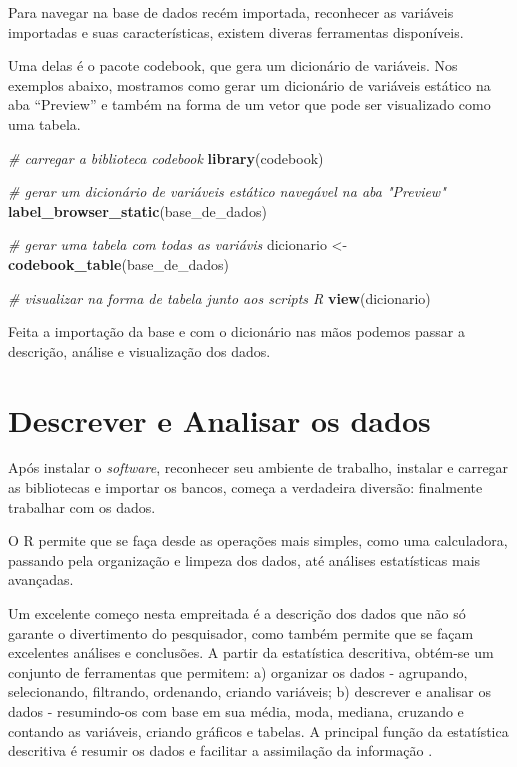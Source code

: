 \documentclass[
  brazil,
]{book}
\newenvironment{Shaded}{\begin{snugshade}}{\end{snugshade}}
\newcommand{\CommentTok}[1]{\textcolor[rgb]{0.56,0.35,0.01}{\textit{#1}}}
\newcommand{\KeywordTok}[1]{\textcolor[rgb]{0.13,0.29,0.53}{\textbf{#1}}}
\newcommand{\NormalTok}[1]{#1}
\newcommand{\StringTok}[1]{\textcolor[rgb]{0.31,0.60,0.02}{#1}}
\begin{document}
Para navegar na base de dados recém importada, reconhecer as variáveis importadas e suas características, existem diveras ferramentas disponíveis.

Uma delas é o pacote codebook, que gera um dicionário de variáveis. Nos exemplos abaixo, mostramos como gerar um dicionário de variáveis estático na aba ``Preview'' e também na forma de um vetor que pode ser visualizado como uma tabela.

\begin{Shaded}
\begin{Highlighting}[]
\CommentTok{# carregar a biblioteca codebook}
\KeywordTok{library}\NormalTok{(codebook)}

\CommentTok{# gerar um dicionário de variáveis estático navegável na aba "Preview"}
\KeywordTok{label_browser_static}\NormalTok{(base_de_dados)}

\CommentTok{# gerar uma tabela com todas as variávis}
\NormalTok{dicionario <-}\StringTok{ }\KeywordTok{codebook_table}\NormalTok{(base_de_dados)}

\CommentTok{# visualizar na forma de tabela junto aos scripts R}
\KeywordTok{view}\NormalTok{(dicionario)}
\end{Highlighting}
\end{Shaded}

Feita a importação da base e com o dicionário nas mãos podemos passar a descrição, análise e visualização dos dados.

\hypertarget{descrever-e-analisar-os-dados}{%
\chapter{Descrever e Analisar os dados}\label{descrever-e-analisar-os-dados}}

Após instalar o \emph{software}, reconhecer seu ambiente de trabalho, instalar e carregar as bibliotecas e importar os bancos, começa a verdadeira diversão: finalmente trabalhar com os dados.

O R permite que se faça desde as operações mais simples, como uma calculadora, passando pela organização e limpeza dos dados, até análises estatísticas mais avançadas.

Um excelente começo nesta empreitada é a descrição dos dados que não só garante o divertimento do pesquisador, como também permite que se façam excelentes análises e conclusões. A partir da estatística descritiva, obtém-se um conjunto de ferramentas que permitem: a) organizar os dados - agrupando, selecionando, filtrando, ordenando, criando variáveis; b) descrever e analisar os dados - resumindo-os com base em sua média, moda, mediana, cruzando e contando as variáveis, criando gráficos e tabelas. A principal função da estatística descritiva é resumir os dados e facilitar a assimilação da informação \citep{agresti_metodos_2012}.
\end{document}
